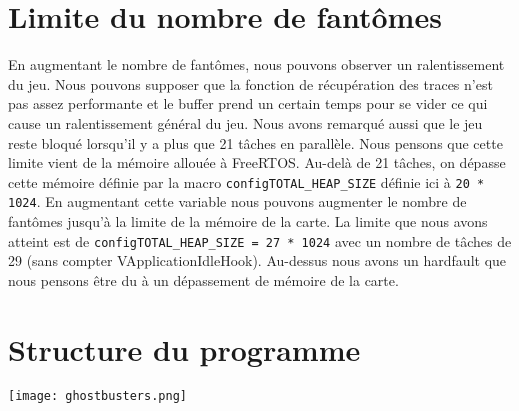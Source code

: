 \documentclass[a4paper]{article}
\begin{document}
\section{Limite du nombre de fantômes}
En augmentant le nombre de fantômes, nous pouvons observer un ralentissement du jeu.
Nous pouvons supposer que la fonction de récupération des traces n'est pas assez
performante et le buffer prend un certain temps pour se vider ce qui cause un ralentissement
général du jeu.
\newline
Nous avons remarqué aussi que le jeu reste bloqué lorsqu'il y a plus que 21 tâches
en parallèle. Nous pensons que cette limite vient de la mémoire allouée à FreeRTOS.
Au-delà de 21 tâches, on dépasse cette mémoire définie par la macro \texttt{configTOTAL_HEAP_SIZE}
définie ici à \texttt{20 * 1024}. En augmentant cette variable nous pouvons augmenter le
nombre de fantômes jusqu'à la limite de la mémoire de la carte. La limite que nous
avons atteint est de \texttt{configTOTAL_HEAP_SIZE = 27 * 1024} avec un nombre de tâches
de 29 (sans compter VApplicationIdleHook). Au-dessus nous avons un hardfault que
nous pensons être du à un dépassement de mémoire de la carte.

\section{Structure du programme}
\begin{center}
\texttt{[image: ghostbusters.png]}
\end{center}
\end{document}
